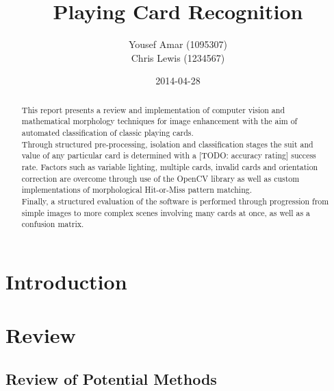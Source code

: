 \documentclass[a4paper,12pt,notitlepage]{article}
\begin{document}
\parskip 2mm

\title{{\huge Playing Card Recognition}\\}
\author{Yousef Amar (1095307)\\Chris Lewis (1234567)}
\date{2014-04-28}
\maketitle
\thispagestyle{empty}
\vfill
\begin{abstract}
	This report presents a review and implementation of computer vision and mathematical morphology techniques for image enhancement with the aim of automated classification of classic playing cards.\\[4px]
	Through structured pre-processing, isolation and classification stages the suit and value of any particular card is determined with a [TODO: accuracy rating] success rate. Factors such as variable lighting, multiple cards, invalid cards and orientation correction are overcome through use of the OpenCV library as well as custom implementations of morphological Hit-or-Miss pattern matching.\\[4px]
	Finally, a structured evaluation of the software is performed through progression from simple images to more complex scenes involving many cards at once, as well as a confusion matrix.
\end{abstract}
\pagebreak

\tableofcontents
\thispagestyle{empty}
\pagebreak
\setcounter{page}{1}

\parskip 2mm
\section{Introduction}
	

\pagebreak
\section{Review}
	\label{sec:review}
	\subsection{Review of Potential Methods}
\end{document}
